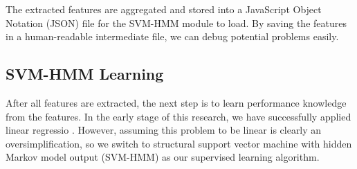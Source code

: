    The extracted features are aggregated and stored into a JavaScript Object Notation (JSON) file for the SVM-HMM module to load. By saving the features in a human-readable intermediate file, we can debug potential problems easily.%


\subsection{SVM-HMM Learning}
After all features are extracted, the next step is to learn performance knowledge from the features. In the early stage of this research, we have successfully applied linear regressio \cite{Lyu2012}. However, assuming this problem to be linear is clearly an oversimplification, so we switch to structural support vector machine with hidden Markov model output (SVM-HMM)\cite{svm2009, svm2005, svm2003} as our supervised learning algorithm. 

